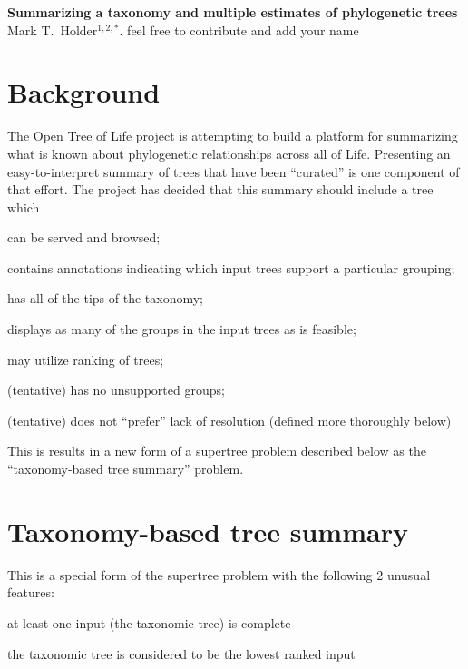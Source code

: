 \documentclass[11pt]{article}
\newcommand{\otol}{Open Tree of Life\xspace}
\begin{document}
\begin{center}
    {\bf Summarizing a taxonomy and multiple estimates of phylogenetic trees} \\
{Mark T.~Holder$^{1,2,\ast}$. feel free to contribute and add your name}
\end{center}
\section{Background}
The \otol project is attempting to build a platform for summarizing what is known
    about phylogenetic relationships across all of Life.
Presenting an easy-to-interpret summary of trees that have been ``curated''
    is one component of that effort.
The project has decided that this summary should include a tree which
\begin{compactenum}
    \item can be served and browsed;
    \item contains annotations indicating which input trees support a particular grouping;
    \item has all of the tips of the taxonomy;
    \item displays as many of the groups in the input trees as is feasible;
    \item may utilize ranking of trees;
    \item (tentative) has no unsupported groups;
    \item (tentative) does not ``prefer'' lack of resolution (defined more thoroughly below)
\end{compactenum}
This is results in a new form of a supertree problem described below as the ``taxonomy-based tree summary'' problem.
\section{Taxonomy-based tree summary}
This is a special form of the supertree problem with the following 2 unusual features:
\begin{compactenum}
    \item at least one input (the taxonomic tree) is complete
    \item the taxonomic tree is considered to be the lowest ranked input
\end{compactenum}





\end{document}

